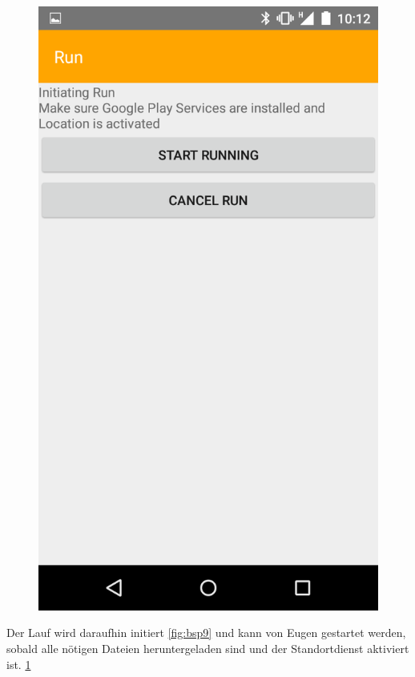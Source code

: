 \begin{figure}[!h]
\begin{minipage}{.4\textwidth}
  \includegraphics[width=.8\linewidth]{abb/bsp/bsp10}
  \label{fig:bsp10}
\end{minipage}
\end{figure}

Der Lauf wird daraufhin initiert \ref{fig:bsp9} und kann von Eugen gestartet werden, sobald alle nötigen Dateien heruntergeladen sind und der Standortdienst aktiviert ist. \ref{fig:bsp10}

